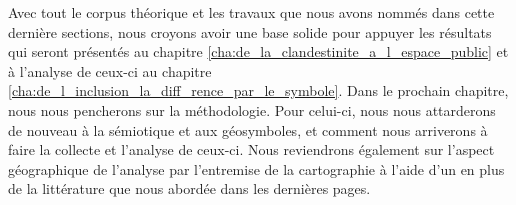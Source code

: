 Avec tout le corpus théorique et les travaux que nous avons nommés dans cette dernière sections, nous croyons avoir une base solide pour appuyer les résultats qui seront présentés au chapitre \ref{cha:de_la_clandestinite_a_l_espace_public} et à l'analyse de ceux-ci au chapitre \ref{cha:de_l_inclusion_la_diff_rence_par_le_symbole}.
Dans le prochain chapitre, nous nous pencherons sur la méthodologie.
Pour celui-ci, nous nous attarderons de nouveau à la sémiotique et aux géosymboles, et comment nous arriverons à faire la collecte et l'analyse de ceux-ci.
Nous reviendrons également sur l'aspect géographique de l'analyse par l'entremise de la cartographie à l'aide d'un \sig{} en plus de la littérature que nous abordée dans les dernières pages.


